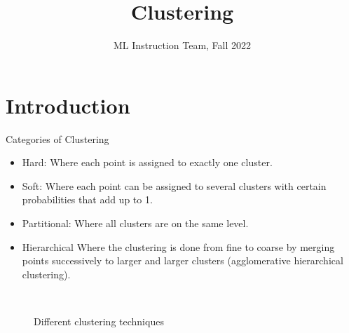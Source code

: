 \documentclass[compress,oilve]{beamer}
\title{Clustering}
\author{ML Instruction Team, Fall 2022}
\institute[]{CE Department \newline  Sharif University of Technology \newline \newline}
\date[\today]{}
\newcommand{\tc}[2]{
	\textcolor{#1}{#2}
}
\begin{document}
	
	\fontsize{9}{9}
\begin{frame}
	\titlepage
\end{frame}

\section{Introduction}

\begin{frame}{Categories of Clustering}
	\begin{itemize}
		\item \tc{keywords}{Hard:}Where each point is assigned to
		exactly one cluster.
		
		\medskip
		\item \tc{keywords}{Soft:}Where each point can be assigned to several clusters with certain probabilities that add up to 1.
		
		\medskip
		\item \tc{keywords}{Partitional:}Where all clusters are on the same level.
		
		\medskip
		\item \tc{keywords}{Hierarchical}Where the clustering is done from fine to coarse by merging points successively to larger and larger clusters (agglomerative hierarchical clustering).
		
	\end{itemize}

		\begin{figure}[htbp!]
		\qquad
		\\
		
		\tiny
		\caption{Different clustering techniques}
		\label{fig:globalfigure2}
		
	\end{figure}
	

\end{frame}
\end{document}
